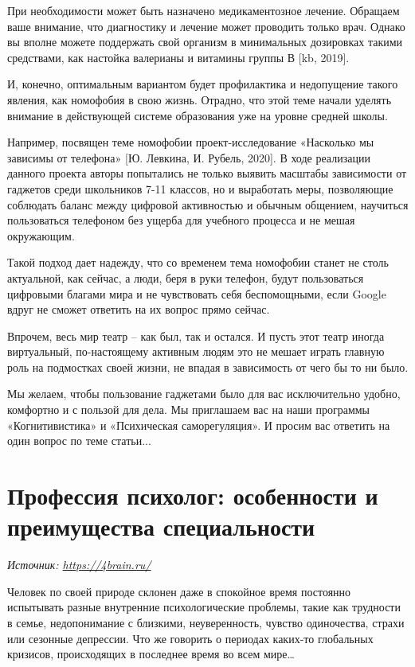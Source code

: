 При необходимости может быть назначено медикаментозное лечение. Обращаем ваше внимание, что диагностику и лечение может проводить только врач. Однако вы вполне можете поддержать свой организм в минимальных дозировках такими средствами, как настойка валерианы и витамины группы В [kb, 2019].

И, конечно, оптимальным вариантом будет профилактика и недопущение такого явления, как номофобия в свою жизнь. Отрадно, что этой теме начали уделять внимание в действующей системе образования уже на уровне средней школы.

Например, посвящен теме номофобии проект-исследование «Насколько мы зависимы от телефона» [Ю. Левкина, И. Рубель, 2020]. В ходе реализации данного проекта авторы попытались не только выявить масштабы зависимости от гаджетов среди школьников 7-11 классов, но и выработать меры, позволяющие соблюдать баланс между цифровой активностью и обычным общением, научиться пользоваться телефоном без ущерба для учебного процесса и не мешая окружающим.

Такой подход дает надежду, что со временем тема номофобии станет не столь актуальной, как сейчас, а люди, беря в руки телефон, будут пользоваться цифровыми благами мира и не чувствовать себя беспомощными, если Google вдруг не сможет ответить на их вопрос прямо сейчас.

Впрочем, весь мир театр – как был, так и остался. И пусть этот театр иногда виртуальный, по-настоящему активным людям это не мешает играть главную роль на подмостках своей жизни, не впадая в зависимость от чего бы то ни было.

Мы желаем, чтобы пользование гаджетами было для вас исключительно удобно, комфортно и с пользой для дела. Мы приглашаем вас на наши программы «Когнитивистика» и «Психическая саморегуляция». И просим вас ответить на один вопрос по теме статьи...

\newpage
\section{Профессия психолог: особенности и преимущества специальности}

\textit{Источник: \url{https://4brain.ru/}}

Человек по своей природе склонен даже в спокойное время постоянно испытывать разные внутренние психологические проблемы, такие как трудности в семье, недопонимание с близкими, неуверенность, чувство одиночества, страхи или сезонные депрессии. Что же говорить о периодах каких-то глобальных кризисов, происходящих в последнее время во всем мире…

